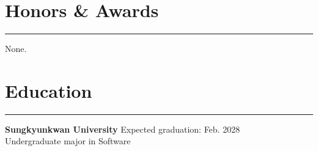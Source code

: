 \documentclass[letterpaper,11pt]{article}
\begin{document}
\section*{Honors \& Awards}
\hrule
\vspace{6pt}
None.

\section*{Education}
\hrule
\vspace{6pt}
\textbf{Sungkyunkwan University} \hfill Expected graduation: Feb. 2028\\
Undergraduate major in Software
\end{document}

